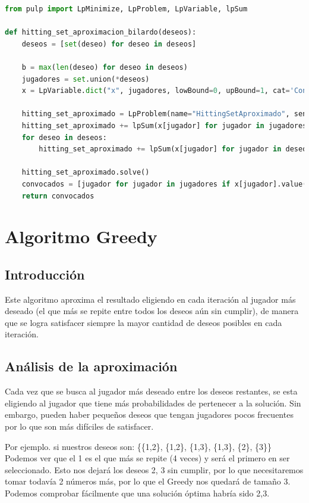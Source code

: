 \documentclass{estilo}
\begin{document}
\begin{lstlisting}[language=Python]
from pulp import LpMinimize, LpProblem, LpVariable, lpSum

def hitting_set_aproximacion_bilardo(deseos):
    deseos = [set(deseo) for deseo in deseos]
    
    b = max(len(deseo) for deseo in deseos)
    jugadores = set.union(*deseos)
    x = LpVariable.dict("x", jugadores, lowBound=0, upBound=1, cat='Continuous')
    
    hitting_set_aproximado = LpProblem(name="HittingSetAproximado", sense=LpMinimize)
    hitting_set_aproximado += lpSum(x[jugador] for jugador in jugadores)
    for deseo in deseos:
        hitting_set_aproximado += lpSum(x[jugador] for jugador in deseo) >= 1
        
    hitting_set_aproximado.solve()
    convocados = [jugador for jugador in jugadores if x[jugador].value() >= 1/b]
    return convocados
\end{lstlisting}



\newpage

\section{Algoritmo Greedy}

\subsection{Introducción}

Este algoritmo aproxima el resultado eligiendo en cada iteración al jugador más deseado (el que más se repite entre todos los deseos aún sin cumplir), de manera que se logra satisfacer siempre la mayor cantidad de deseos posibles en cada iteración.

\subsection{Análisis de la aproximación}

Cada vez que se busca al jugador más deseado entre los deseos restantes, se esta eligiendo al jugador que tiene más probabilidades de pertenecer a la solución. Sin embargo, pueden haber pequeños deseos que tengan jugadores pocos frecuentes por lo que son más difíciles de satisfacer.

Por ejemplo. si nuestros deseos son: \{\{1,2\}, \{1,2\}, \{1,3\}, \{1,3\}, \{2\}, \{3\}\}
Podemos ver que el 1 es el que más se repite (4 veces) y será el primero en ser seleccionado.
Esto nos dejará los deseos {{2}, {3}} sin cumplir, por lo que necesitaremos tomar todavía 2 números más, por lo que el Greedy nos quedará de tamaño 3. Podemos comprobar fácilmente que una solución óptima habría sido {2,3}.
\end{document}

